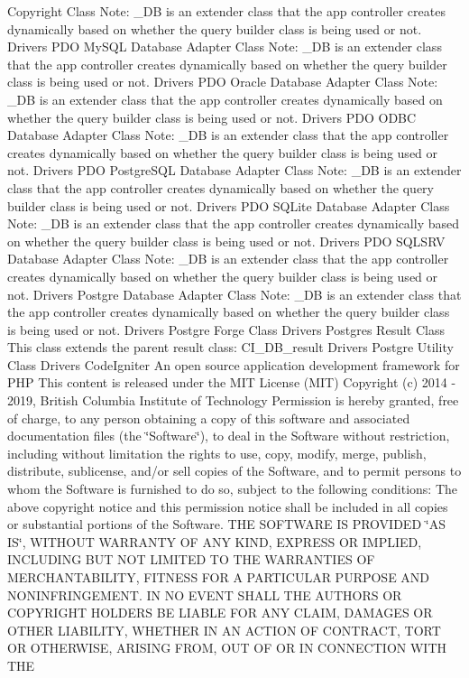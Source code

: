 \begin{DoxyCopyright}{Copyright}
Class Note\+: \+\_\+\+DB is an extender class that the app controller creates dynamically based on whether the query builder class is being used or not.  Drivers P\+DO My\+S\+QL Database Adapter Class Note\+: \+\_\+\+DB is an extender class that the app controller creates dynamically based on whether the query builder class is being used or not.  Drivers P\+DO Oracle Database Adapter Class Note\+: \+\_\+\+DB is an extender class that the app controller creates dynamically based on whether the query builder class is being used or not.  Drivers P\+DO O\+D\+BC Database Adapter Class Note\+: \+\_\+\+DB is an extender class that the app controller creates dynamically based on whether the query builder class is being used or not.  Drivers P\+DO Postgre\+S\+QL Database Adapter Class Note\+: \+\_\+\+DB is an extender class that the app controller creates dynamically based on whether the query builder class is being used or not.  Drivers P\+DO S\+Q\+Lite Database Adapter Class Note\+: \+\_\+\+DB is an extender class that the app controller creates dynamically based on whether the query builder class is being used or not.  Drivers P\+DO S\+Q\+L\+S\+RV Database Adapter Class Note\+: \+\_\+\+DB is an extender class that the app controller creates dynamically based on whether the query builder class is being used or not.  Drivers Postgre Database Adapter Class Note\+: \+\_\+\+DB is an extender class that the app controller creates dynamically based on whether the query builder class is being used or not.  Drivers Postgre Forge Class  Drivers Postgres Result Class This class extends the parent result class\+: C\+I\+\_\+\+D\+B\+\_\+result  Drivers Postgre Utility Class  Drivers Code\+Igniter An open source application development framework for P\+HP This content is released under the M\+IT License (M\+IT) Copyright (c) 2014 -\/ 2019, British Columbia Institute of Technology Permission is hereby granted, free of charge, to any person obtaining a copy of this software and associated documentation files (the \char`\"{}\+Software\char`\"{}), to deal in the Software without restriction, including without limitation the rights to use, copy, modify, merge, publish, distribute, sublicense, and/or sell copies of the Software, and to permit persons to whom the Software is furnished to do so, subject to the following conditions\+: The above copyright notice and this permission notice shall be included in all copies or substantial portions of the Software. T\+HE S\+O\+F\+T\+W\+A\+RE IS P\+R\+O\+V\+I\+D\+ED \char`\"{}\+A\+S I\+S\char`\"{}, W\+I\+T\+H\+O\+UT W\+A\+R\+R\+A\+N\+TY OF A\+NY K\+I\+ND, E\+X\+P\+R\+E\+SS OR I\+M\+P\+L\+I\+ED, I\+N\+C\+L\+U\+D\+I\+NG B\+UT N\+OT L\+I\+M\+I\+T\+ED TO T\+HE W\+A\+R\+R\+A\+N\+T\+I\+ES OF M\+E\+R\+C\+H\+A\+N\+T\+A\+B\+I\+L\+I\+TY, F\+I\+T\+N\+E\+SS F\+OR A P\+A\+R\+T\+I\+C\+U\+L\+AR P\+U\+R\+P\+O\+SE A\+ND N\+O\+N\+I\+N\+F\+R\+I\+N\+G\+E\+M\+E\+NT. IN NO E\+V\+E\+NT S\+H\+A\+LL T\+HE A\+U\+T\+H\+O\+RS OR C\+O\+P\+Y\+R\+I\+G\+HT H\+O\+L\+D\+E\+RS BE L\+I\+A\+B\+LE F\+OR A\+NY C\+L\+A\+IM, D\+A\+M\+A\+G\+ES OR O\+T\+H\+ER L\+I\+A\+B\+I\+L\+I\+TY, W\+H\+E\+T\+H\+ER IN AN A\+C\+T\+I\+ON OF C\+O\+N\+T\+R\+A\+CT, T\+O\+RT OR O\+T\+H\+E\+R\+W\+I\+SE, A\+R\+I\+S\+I\+NG F\+R\+OM, O\+UT OF OR IN C\+O\+N\+N\+E\+C\+T\+I\+ON W\+I\+TH T\+HE 
\end{DoxyCopyright}
